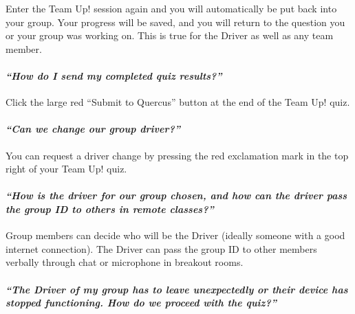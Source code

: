 \documentclass[
  openany]{book}
\begin{document}
Enter the Team Up! session again and you will automatically be put back into your group. Your progress will be saved, and you will return to the question you or your group was working on. This is true for the Driver as well as any team member.

\hypertarget{how-do-i-send-my-completed-quiz-results}{%
\paragraph{\texorpdfstring{\emph{``How do I send my completed quiz results?''}}{``How do I send my completed quiz results?''}}\label{how-do-i-send-my-completed-quiz-results}}

Click the large red ``Submit to Quercus'' button at the end of the Team Up! quiz.

\hypertarget{can-we-change-our-group-driver}{%
\paragraph{\texorpdfstring{\emph{``Can we change our group driver?''}}{``Can we change our group driver?''}}\label{can-we-change-our-group-driver}}

You can request a driver change by pressing the red exclamation mark in the top right of your Team Up! quiz.

\hypertarget{how-is-the-driver-for-our-group-chosen-and-how-can-the-driver-pass-the-group-id-to-others-in-remote-classes}{%
\paragraph{\texorpdfstring{\emph{``How is the driver for our group chosen, and how can the driver pass the group ID to others in remote classes?''}}{``How is the driver for our group chosen, and how can the driver pass the group ID to others in remote classes?''}}\label{how-is-the-driver-for-our-group-chosen-and-how-can-the-driver-pass-the-group-id-to-others-in-remote-classes}}

Group members can decide who will be the Driver (ideally someone with a good internet connection). The Driver can pass the group ID to other members verbally through chat or microphone in breakout rooms.

\hypertarget{the-driver-of-my-group-has-to-leave-unexpectedly-or-their-device-has-stopped-functioning.-how-do-we-proceed-with-the-quiz}{%
\paragraph{\texorpdfstring{\emph{``The Driver of my group has to leave unexpectedly or their device has stopped functioning. How do we proceed with the quiz?''}}{``The Driver of my group has to leave unexpectedly or their device has stopped functioning. How do we proceed with the quiz?''}}\label{the-driver-of-my-group-has-to-leave-unexpectedly-or-their-device-has-stopped-functioning.-how-do-we-proceed-with-the-quiz}}
\end{document}

